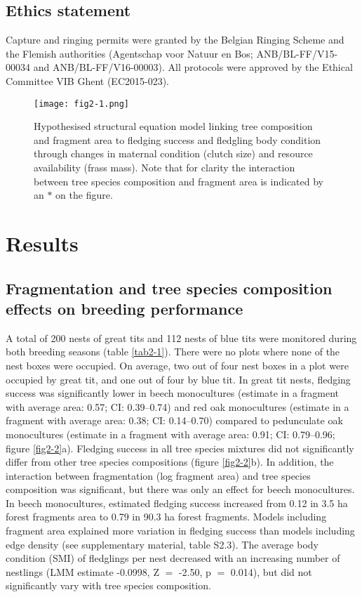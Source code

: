 \documentclass[10pt, twoside]{book} %
\begin{document}
		\subsection*{Ethics statement}
		
		Capture and ringing permits were granted by the Belgian Ringing Scheme and the Flemish authorities (Agentschap voor Natuur en Bos; ANB/BL-FF/V15-00034 and ANB/BL-FF/V16-00003). All protocols were approved by the Ethical Committee VIB Ghent (EC2015-023).
		
\begin{figure}[h!]
	\begin{center}
		\texttt{[image: fig2-1.png]}
	\end{center}
	\caption{Hypothesised structural equation model linking tree composition and fragment area to fledging success and fledgling body condition through changes in maternal condition (clutch size) and resource availability (frass mass). Note that for clarity the interaction between tree species composition and fragment area is indicated by an $\ast$ on the figure.  \label{fig2-1}}
\end{figure}
\clearpage
		
\clearpage		
	\section{Results}
		\subsection*{Fragmentation and tree species composition effects on breeding performance}
		
		A total of 200 nests of great tits and 112 nests of blue tits were monitored during both breeding seasons (table \ref{tab2-1}). There were no plots where none of the nest boxes were occupied. On average, two out of four nest boxes in a plot were occupied by great tit, and one out of four by blue tit. In great tit nests, fledging success was significantly lower in beech monocultures (estimate in a fragment with average area: 0.57; CI: 0.39--0.74) and red oak monocultures (estimate in a fragment with average area: 0.38; CI: 0.14--0.70) compared to pedunculate oak monocultures (estimate in a fragment with average area: 0.91; CI: 0.79--0.96; figure \ref{fig2-2}a). Fledging success in all tree species mixtures did not significantly differ from other tree species compositions (figure \ref{fig2-2}b). In addition, the interaction between fragmentation (log fragment area) and tree species composition was significant, but there was only an effect for beech monocultures. In beech monocultures, estimated fledging success increased from 0.12 in 3.5 ha forest fragments area to 0.79 in 90.3 ha forest fragments. Models including fragment area explained more variation in fledging success than models including edge density (see supplementary material, table S2.3). The average body condition (SMI) of fledglings per nest decreased with an increasing number of nestlings (LMM estimate -0.0998, Z $=$ -2.50, p $=$ 0.014), but did not significantly vary with tree species composition.\\
		
\end{document}
